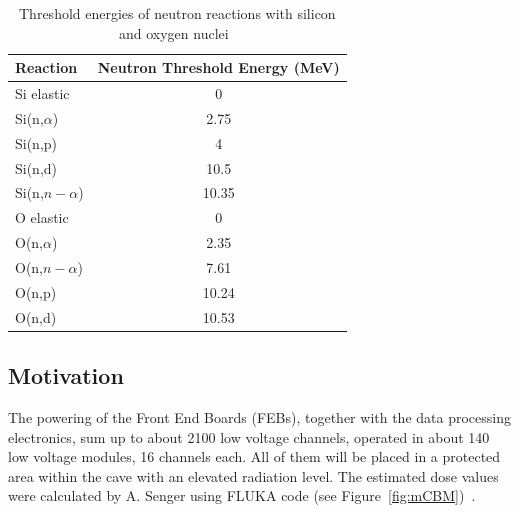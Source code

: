 \begin{table}[!h]
\centering
\begin{tabular}{lc}
\hline
Reaction         & Neutron Threshold Energy (MeV) \\ \hline
Si elastic       & 0                              \\
Si(n,$\alpha$)   & 2.75                           \\
Si(n,p)          & 4                              \\
Si(n,d)          & 10.5                           \\
Si(n,$n-\alpha$) & 10.35                          \\ \hline
O elastic        & 0                              \\
O(n,$\alpha$)    & 2.35                           \\
O(n,$n-\alpha$)  & 7.61                           \\
O(n,p)           & 10.24                          \\
O(n,d)           & 10.53                         
\end{tabular}
\caption{Threshold energies of neutron reactions with silicon and oxygen nuclei~\cite{ENDF}}
\label{cross-seciton}
\end{table}

\newpage
\subsection{Motivation}

The powering of the Front End Boards (\gls{FEB}s), together with the data processing electronics, sum up to about 2100 low voltage channels, operated in about 140 low voltage modules, 16 channels each. All of them will be placed in a protected area within the cave with an elevated radiation level. The estimated dose values were calculated by A. Senger using FLUKA code (see Figure~\ref{fig:mCBM})~\cite{FLUKA}. 

